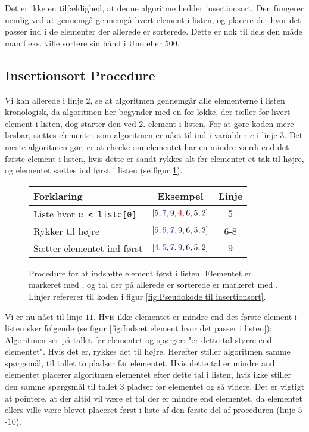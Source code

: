 Det er ikke en tilfældighed, at denne algoritme hedder insertionsort. Den fungerer nemlig ved at gennemgå gennemgå hvert element i listen, og placere det hvor det passer ind i de elementer der allerede er sorterede. Dette er nok til dels den måde man f.eks. ville sortere sin hånd i Uno eller 500. 

\subsection{Insertionsort Procedure}%
\label{sub:Insertionsort Procedure}

Vi kan allerede i linje 2, se at algoritmen gennemgår alle elementerne i listen kronologisk, da algoritmen her begynder med en for-løkke, der tæller for hvert element i listen, dog starter den ved 2. element i listen. For at gøre koden mere læsbar, sættes elementet som algoritmen er nået til ind i variablen $e$ i linje 3. Det næste algoritmen gør, er at checke om elementet har en mindre værdi end det første element i listen, hvis dette er sandt rykkes alt før elementet et tak til højre, og elementet sættes ind først i listen (se figur \ref{fig:Indsæt element først i listen}).

\begin{figure}[h]
	\begin{center}
		\padtable
		\begin{tabular}{l|c|c}
			Forklaring & Eksempel & Linje \\
			\hline
			Liste hvor \verb|e < liste[0]| & $[\color{blue}5\color{black},\color{blue}7\color{black},\color{blue}9\color{black},\color{red}4\color{black},6,5,2]$ & $5$ \\
			Rykker til højre & $[\color{blue}5\color{black},\color{blue}5\color{black},\color{blue}7\color{black},\color{blue}9\color{black},6,5,2]$ & $6$-$8$\\
			Sætter elementet ind først  & $[\color{red}4\color{black},\color{blue}5\color{black},\color{blue}7\color{black},\color{blue}9\color{black},6,5,2]$ & $9$
		\end{tabular}
	\end{center}
	\vspace{-3mm}
	\caption{Procedure for at indsætte element først i listen. Elementet er markeret med , og tal der på allerede er sorterede er markeret med . Linjer refererer til koden i figur \ref{fig:Pseudokode til insertionsort}.}
	\label{fig:Indsæt element først i listen}
\end{figure}


Vi er nu nået til linje $11$. Hvis ikke elementet er mindre end det første element i listen sker følgende (se figur \ref{fig:Indsæt element hvor det passer i listen}): Algoritmen ser på tallet før elementet og spørger: "er dette tal større end elementet". Hvis det er, rykkes det til højre. Herefter stiller algoritmen samme spørgsmål, til tallet to pladser før elementet. Hvis dette tal er mindre and elementet placerer algoritmen elementet efter dette tal i listen, hvis ikke stiller den samme spørgsmål til tallet 3 pladser før elementet og så videre. Det er vigtigt at pointere, at der altid vil være et tal der er mindre end elementet, da elementet ellers ville være blevet placeret først i liste af den første del af proceduren (linje $5$-$10$).


